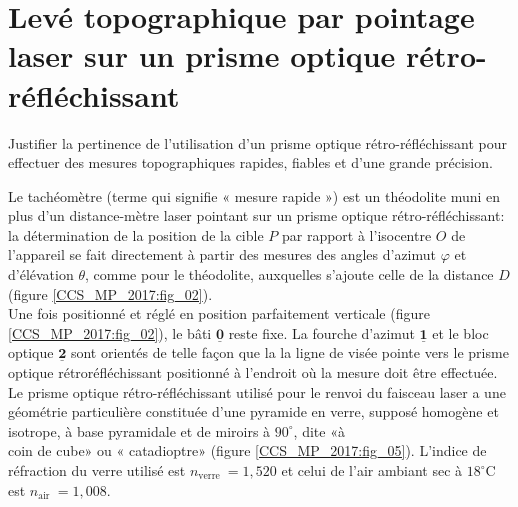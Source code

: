 \section{Levé topographique par pointage laser sur un prisme optique rétro-réfléchissant \label{CCS_MP_2017:p3}}
\begin{obj}
Justifier la pertinence de l'utilisation d'un prisme optique rétro-réfléchissant pour effectuer des mesures topographiques rapides, fiables et d'une grande précision.
\end{obj}

Le tachéomètre (terme qui signifie « mesure rapide ») est un théodolite muni en plus d'un distance-mètre laser pointant sur un prisme optique rétro-réfléchissant: la détermination de la position de la cible $P$ par rapport à l'isocentre $O$ de l'appareil se fait directement à partir des mesures des angles d'azimut $\varphi$ et d'élévation $\theta$, comme pour le théodolite, auxquelles s'ajoute celle de la distance $D$ (figure \ref{CCS_MP_2017:fig_02}).\\
Une fois positionné et réglé en position parfaitement verticale (figure \ref{CCS_MP_2017:fig_02}), le bâti $\underline{\mathbf{0}}$ reste fixe. La fourche d'azimut $\underline{\mathbf{1}}$ et le bloc optique $\underline{\mathbf{2}}$ sont orientés de telle façon que la la ligne de visée pointe vers le prisme optique rétroréfléchissant positionné à l'endroit où la mesure doit être effectuée.\\
Le prisme optique rétro-réfléchissant utilisé pour le renvoi du faisceau laser a une géométrie particulière constituée d'une pyramide en verre, supposé homogène et isotrope, à base pyramidale et de miroirs à $90^{\circ}$, dite «à\\
coin de cube» ou « catadioptre» (figure \ref{CCS_MP_2017:fig_05}). L'indice de réfraction du verre utilisé est $n_{\text {verre }}=1,520$ et celui de l'air ambiant sec à $18^{\circ} \mathrm{C}$ est $n_{\text {air }}=1,008$.\\


